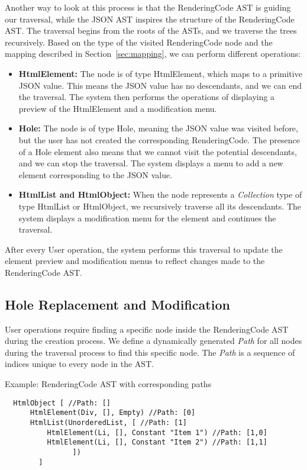 Another way to look at this process is that the RenderingCode AST is guiding our traversal, while the JSON AST inspires the structure of the RenderingCode AST.
The traversal begins from the roots of the ASTs, and we traverse the trees recursively.
Based on the type of the visited RenderingCode node and the mapping described in Section~\ref{sec:mapping}, we can perform different operations:
\begin{itemize}
	\item \textbf{HtmlElement:} The node is of type HtmlElement, which maps to a primitive JSON value. This means the JSON value has no descendants, and we can end the traversal.
	      The system then performs the operations of displaying a preview of the HtmlElement and a modification menu.
	\item \textbf{Hole:} The node is of type Hole, meaning the JSON value was visited before, but the user has not created the corresponding RenderingCode.
	      The presence of a Hole element also means that we cannot visit the potential descendants, and we can stop the traversal.
	      The system displays a menu to add a new element corresponding to the JSON value.

	\item \textbf{HtmlList and HtmlObject:} When the node represents a \emph{Collection} type of type HtmlList or HtmlObject, we recursively traverse all its descendants.
	      The system displays a modification menu for the element and continues the traversal.
\end{itemize}

After every User operation, the system performs this traversal to update the element preview and modification menus to reflect changes made to the RenderingCode AST.


\subsection{Hole Replacement and Modification}

User operations require finding a specific node inside the RenderingCode AST during the creation process.
We define a dynamically generated \emph{Path} for all nodes during the traversal process to find this specific node.
The \emph{Path} is a sequence of indices unique to every node in the AST.

\begin{listing}[h]
	\caption {Example: RenderingCode AST with corresponding paths}
	\label{fig:paths}
	\begin{lstlisting}
  HtmlObject [ //Path: []
      HtmlElement(Div, [], Empty) //Path: [0]
      HtmlList(UnorderedList, [ //Path: [1]
          HtmlElement(Li, [], Constant "Item 1") //Path: [1,0]
          HtmlElement(Li, [], Constant "Item 2") //Path: [1,1]
				])
		]
  \end{lstlisting}
\end{listing}

